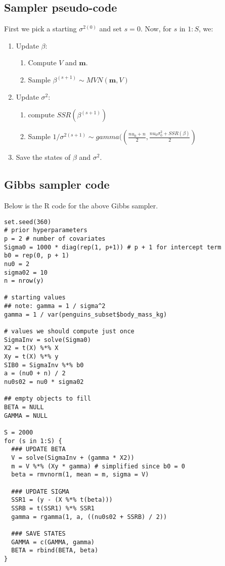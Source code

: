 \documentclass[titlepage, 12pt, leqno]{article}
\begin{document}
\subsection{Sampler pseudo-code}
First we pick a starting $\sigma^{2(0)}$ and set $s=0$. Now, for $s$ in $1:S$,
we:
\begin{enumerate}
    \item Update $\beta$:
        \begin{enumerate}
            \item Compute $V$ and $\textbf{m}$.
            \item Sample $\beta^{(s+1)} \sim MVN(\textbf{m}, V)$
        \end{enumerate}
    \item Update $\sigma^{2}$:
        \begin{enumerate}
            \item compute $SSR(\beta^{(s+1)})$
            \item Sample $1/\sigma^{2(s+1)} \sim gamma(\left(\frac{nu_{0}+n}{2},
                \frac{nu_{0}\sigma^{2}_{0}+SSR(\beta)}{2}\right)$
        \end{enumerate}
    \item Save the states of $\beta$ and $\sigma^{2}$.
\end{enumerate}

\subsection{Gibbs sampler code}
Below is the R code for the above Gibbs sampler.
\begin{verbatim}
set.seed(360)
# prior hyperparameters 
p = 2 # number of covariates
Sigma0 = 1000 * diag(rep(1, p+1)) # p + 1 for intercept term
b0 = rep(0, p + 1)
nu0 = 2
sigma02 = 10
n = nrow(y)

# starting values
## note: gamma = 1 / sigma^2
gamma = 1 / var(penguins_subset$body_mass_kg)

# values we should compute just once
SigmaInv = solve(Sigma0)
X2 = t(X) %*% X
Xy = t(X) %*% y
SIB0 = SigmaInv %*% b0
a = (nu0 + n) / 2
nu0s02 = nu0 * sigma02

## empty objects to fill
BETA = NULL
GAMMA = NULL

S = 2000
for (s in 1:S) {
  ### UPDATE BETA
  V = solve(SigmaInv + (gamma * X2))
  m = V %*% (Xy * gamma) # simplified since b0 = 0
  beta = rmvnorm(1, mean = m, sigma = V)
  
  ### UPDATE SIGMA
  SSR1 = (y - (X %*% t(beta)))
  SSRB = t(SSR1) %*% SSR1
  gamma = rgamma(1, a, ((nu0s02 + SSRB) / 2))
  
  ### SAVE STATES
  GAMMA = c(GAMMA, gamma)
  BETA = rbind(BETA, beta)
}
\end{verbatim}
\end{document}
